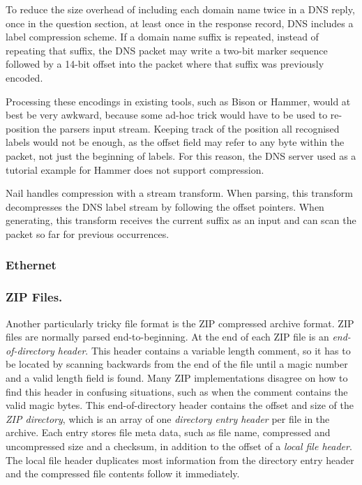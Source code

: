 To reduce the size overhead of including each domain name twice in a DNS reply, once in the
question section, at least once in the response record, DNS includes a label compression scheme. If
a domain name suffix is repeated, instead of repeating that suffix, the DNS packet may write a
two-bit marker sequence followed by a 14-bit offset into the packet where that suffix was previously
encoded.

Processing these encodings in existing tools, such as Bison or Hammer, would at best be very
awkward, because some ad-hoc trick would have to be used to re-position the parsers input stream.
Keeping track of the position all recognised labels would not be enough, as the offset field may
refer to any byte within the packet, not just the beginning of labels. For this reason, the DNS
server used as a tutorial example for Hammer does not support compression.

Nail handles compression with a stream transform. When parsing, this transform decompresses the DNS
label stream by following the offset pointers. When generating, this transform receives the current
suffix as an input and can scan the packet so far for previous occurrences. 


\subsubsection{Ethernet}
\XXX[TODO]
\subsubsection{ZIP Files.}

\label{s:eval-format-zip}
Another particularly tricky file format is the ZIP compressed archive format\cite{pkzip}.
ZIP files are normally parsed end-to-beginning. At the end of each ZIP file is an \emph{end-of-directory
header}. This header contains a variable length comment, so it has to be located by scanning
backwards from the end of the file until a magic number and a valid length field is found. Many ZIP
implementations disagree on how to find this header in confusing situations, such as when the
comment contains the valid magic bytes\cite{wolf-berlinsides-zip}.
This end-of-directory header contains the offset and size of the \emph{ZIP directory}, which is an
array of one \emph{directory entry header} per file in the archive.
Each entry stores file meta data, such as file name, compressed and uncompressed size and a checksum,
in addition to the offset of a \emph{local file header}. The local file header duplicates most
information from the directory entry header and the compressed file contents follow it immediately.

